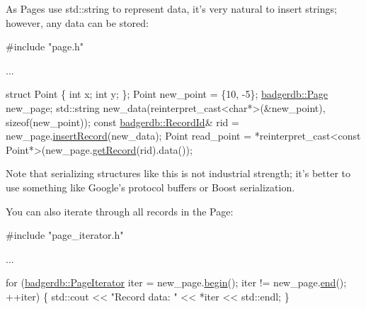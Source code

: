 As Pages use std\-::string to represent data, it's very natural to insert strings; however, any data can be stored\-: 
\begin{DoxyCode}
\textcolor{preprocessor}{#include "page.h"}

...

struct Point \{
  \textcolor{keywordtype}{int} x;
  \textcolor{keywordtype}{int} y;
\};
Point new\_point = \{10, -5\};
\hyperlink{classbadgerdb_1_1Page}{badgerdb::Page} new\_page;
std::string new\_data(reinterpret\_cast<char*>(&new\_point),
                     \textcolor{keyword}{sizeof}(new\_point));
\textcolor{keyword}{const} \hyperlink{structbadgerdb_1_1RecordId}{badgerdb::RecordId}& rid = new\_page.\hyperlink{classbadgerdb_1_1Page_ad0b1e85fe7849fb767dd8c21a8053cf4}{insertRecord}(new\_data);
Point read\_point =
    *\textcolor{keyword}{reinterpret\_cast<}\textcolor{keyword}{const }Point*\textcolor{keyword}{>}(new\_page.\hyperlink{classbadgerdb_1_1Page_a77b352920c3e66384317bbcdcd900d99}{getRecord}(rid).data());
\end{DoxyCode}
 Note that serializing structures like this is not industrial strength; it's better to use something like Google's protocol buffers or Boost serialization.

You can also iterate through all records in the Page\-: 
\begin{DoxyCode}
\textcolor{preprocessor}{#include "page\_iterator.h"}

...

for (\hyperlink{classbadgerdb_1_1PageIterator}{badgerdb::PageIterator} iter = new\_page.\hyperlink{classbadgerdb_1_1Page_aa0fdb281074cd60cb1f1d6ea6d620772}{begin}();
     iter != new\_page.\hyperlink{classbadgerdb_1_1Page_a8e78cba69bef682a5427932485da4608}{end}();
     ++iter) \{
  std::cout << \textcolor{stringliteral}{"Record data: "} << *iter << std::endl;
\}
\end{DoxyCode}
 